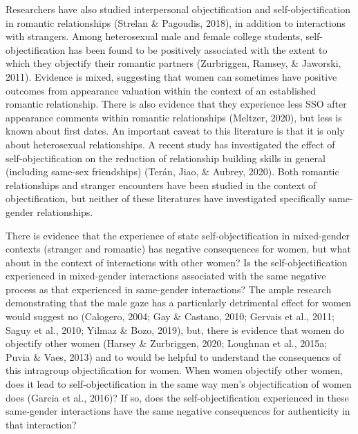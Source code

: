 \documentclass[man]{apa6}
\begin{document}
Researchers have also studied interpersonal objectification and
self-objectification in romantic relationships (Strelan \& Pagoudis,
2018), in addition to interactions with strangers. Among heterosexual
male and female college students, self-objectification has been found to
be positively associated with the extent to which they objectify their
romantic partners (Zurbriggen, Ramsey, \& Jaworski, 2011). Evidence is
mixed, suggesting that women can sometimes have positive outcomes from
appearance valuation within the context of an established romantic
relationship. There is also evidence that they experience less SSO after
appearance comments within romantic relationships (Meltzer, 2020), but
less is known about first dates. An important caveat to this literature
is that it is only about heterosexual relationships. A recent study has
investigated the effect of self-objectification on the reduction of
relationship building skills in general (including same-sex friendships)
(Terán, Jiao, \& Aubrey, 2020). Both romantic relationships and stranger
encounters have been studied in the context of objectification, but
neither of these literatures have investigated specifically same-gender
relationships.

There is evidence that the experience of state self-objectification in
mixed-gender contexts (stranger and romantic) has negative consequences
for women, but what about in the context of interactions with other
women? Is the self-objectification experienced in mixed-gender
interactions associated with the same negative process as that
experienced in same-gender interactions? The ample research
demonstrating that the male gaze has a particularly detrimental effect
for women would suggest no (Calogero, 2004; Gay \& Castano, 2010;
Gervais et al., 2011; Saguy et al., 2010; Yilmaz \& Bozo, 2019), but,
there is evidence that women do objectify other women (Harsey \&
Zurbriggen, 2020; Loughnan et al., 2015a; Puvia \& Vaes, 2013) and to
would be helpful to understand the consequencs of this intragroup
objectification for women. When women objectify other women, does it
lead to self-objectification in the same way men's objectification of
women does (Garcia et al., 2016)? If so, does the self-objectification
experienced in these same-gender interactions have the same negative
consequences for authenticity in that interaction?
\end{document}
